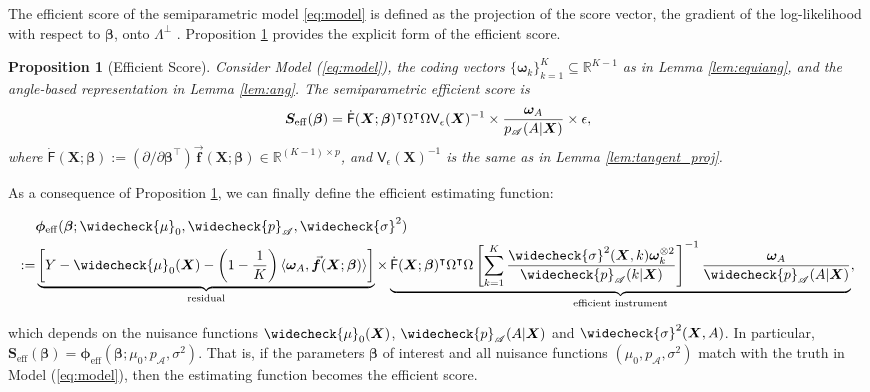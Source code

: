 \documentclass[11pt]{article}
\newtheorem{prop}[thm]{Proposition}
\theoremstyle{definition}
\theoremstyle{remark}
\newcommand{\bbf}{\bm{f}}
\newcommand{\bS}{\bm{S}}
\newcommand{\bX}{\bm{X}}
\newcommand{\bbeta}{\bm{\beta}}
\newcommand{\bomega}{\bm{\omega}}
\newcommand{\bphi}{\bm{\phi}}
\newcommand{\bbR}{\mathbb{R}}
\newcommand{\sA}{\mathscr{A}}
\newcommand{\sfF}{\mathsf{F}}
\newcommand{\sfV}{\mathsf{V}}
\newcommand{\eff}{\mathrm{eff}}
\begin{document}
The efficient score of the semiparametric model \eqref{eq:model} is defined as the projection of the score vector, the gradient of the log-likelihood with respect to $ \bbeta $, onto $ \Lambda^{\perp} $ \citep{tsiatis2007semiparametric}. Proposition \ref{prop:eff_ang} provides the explicit form of the efficient score.

\begin{prop}[Efficient Score] \label{prop:eff_ang}
	Consider Model (\ref{eq:model}), the coding vectors $ \{ \bomega_{k} \}_{k=1}^{K} \subseteq \bbR^{K-1} $ as in Lemma \ref{lem:equiang}, and the angle-based representation in Lemma \ref{lem:ang}. The semiparametric efficient score is
	\[ \bS_{\eff}(\bbeta) = \dot{\sfF}(\bX;\bbeta)^{\intercal}\Omega^{\intercal}\Omega\sfV_{\epsilon}(\bX)^{-1} \times {\bomega_{A} \over p_{\sA}(A|\bX)} \times \epsilon,
	 \]
	where $ \dot{\sfF}(\bX;\bbeta) := (\partial/\partial \bbeta^{\intercal})\vec{\bbf}(\bX;\bbeta) \in \bbR^{(K-1)\times p} $, and $ \sfV_{\epsilon}(\bX)^{-1} $ is the same as in Lemma \ref{lem:tangent_proj}.
\end{prop}

As a consequence of Proposition \ref{prop:eff_ang}, we can finally define the efficient estimating function:
\begin{small}
	\begin{align}
		& \bphi_{\eff}(\bbeta;\widecheck{\mu}_{0},\widecheck{p}_{\sA},\widecheck{\sigma}^{2}) \nonumber \\
		:=& \underbrace{\left [Y - \widecheck{\mu}_{0}(\bX) - \left( 1 - {1 \over K} \right)\langle \bomega_{A},\vec{\bbf}(\bX;\bbeta) \rangle \right ]}_{\text{residual}} \times \underbrace{\dot{\sfF}(\bX;\bbeta)^{\intercal}\Omega^{\intercal}\Omega\left[ \sum_{k=1}^{K}{\widecheck{\sigma}^{2}(\bX,k)\bomega_{k}^{\otimes 2} \over \widecheck{p}_{\sA}(k|\bX)} \right]^{-1}{\bomega_{A} \over \widecheck{p}_{\sA}(A|\bX)}}_{\text{efficient instrument}},\label{eq:estim_fun}
	\end{align}
\end{small}%
which depends on the nuisance functions $ \widecheck{\mu}_{0}(\bX) $, $\widecheck{p}_{\sA}(A|\bX) $ and $ \widecheck{\sigma}^{2}(\bX,A) $. In particular, $ \bS_{\eff}(\bbeta) = \bphi_{\eff}(\bbeta;\mu_{0},p_{\sA},\sigma^{2}) $. That is, if the parameters $ \bbeta $ of interest and all nuisance functions $ (\mu_{0},p_{\sA},\sigma^{2}) $ match with the truth in Model (\ref{eq:model}), then the estimating function becomes the efficient score. 
\end{document}
